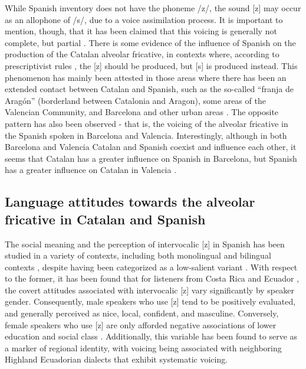 \documentclass[
  a4paper,
  11pt,
  twocolumn]{article}
\begin{document}
While Spanish inventory does not have the phoneme /z/, the sound {[}z{]}
may occur as an allophone of /s/, due to a voice assimilation process.
It is important to mention, though, that it has been claimed that this
voicing is generally not complete, but partial
\cite{benet_cortes_lleo_2012} \cite{hualde_2015}
\cite{hualde_et_al_2020}. There is some evidence of the influence of
Spanish on the production of the Catalan alveolar fricative, in contexts
where, according to prescriptivist rules \cite{iec_2022}, the {[}z{]}
should be produced, but {[}s{]} is produced instead. This phenomenon has
mainly been attested in those areas where there has been an extended
contact between Catalan and Spanish, such as the so-called ``franja de
Aragón'' (borderland between Catalonia and Aragon), some areas of the
Valencian Community, and Barcelona and other urban areas
\cite{benet_cortes_lleo_2012} \cite{recasens_1996} \cite{davidson_2020}.
The opposite pattern has also been observed - that is, the voicing of
the alveolar fricative in the Spanish spoken in Barcelona and Valencia.
Interestingly, although in both Barcelona and Valencia Catalan and
Spanish coexist and influence each other, it seems that Catalan has a
greater influence on Spanish in Barcelona, but Spanish has a greater
influence on Catalan in Valencia \cite{davidson_2020}.

\subsection{Language attitudes towards the alveolar fricative in Catalan and Spanish}

The social meaning and the perception of intervocalic {[}z{]} in Spanish
has been studied in a variety of contexts, including both monolingual
\cite{chappel_et_al_2023} \cite{chappel_2021} \cite{garcia_2019}
\cite{chappel_2016} \cite{chappell_2017} \cite{chappell_garcia_2017}
\cite{silverstein_2003} and bilingual contexts \cite{davidson_2014}
\cite{davidson_2015} \cite{davidson_2019} \cite{sinner_2002}, despite
having been categorized as a low-salient variant
\cite{chappel_et_al_2023} \cite{chappel_2021} \cite{chappell_2017} .
With respect to the former, it has been found that for listeners from
Costa Rica and Ecuador \cite{garcia_2019}, the covert attitudes
associated with intervocalic {[}z{]} vary significantly by speaker
gender. Consequently, male speakers who use {[}z{]} tend to be
positively evaluated, and generally perceived as nice, local, confident,
and masculine. Conversely, female speakers who use {[}z{]} are only
afforded negative associations of lower education and social class
\cite{chappel_et_al_2023} \cite{chappel_2016} \cite{silverstein_2003}.
Additionally, this variable has been found to serve as a marker of
regional identity, with voicing being associated with neighboring
Highland Ecuadorian dialects that exhibit systematic voicing.
\end{document}
